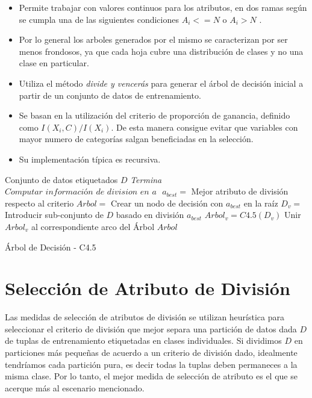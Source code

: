 \begin{itemize}
	\item Permite trabajar con valores continuos para los atributos, en dos ramas según se cumpla una de las siguientes condiciones  $ A_{i} <= N $ o $ A_{i} > N $ . 
	\item Por lo general los arboles generados por el mismo se caracterizan por ser menos frondosos, ya que cada hoja cubre una distribución de clases y no una clase en particular.
	\item Utiliza el método \emph{divide y vencerás} para generar el árbol de decisión inicial a partir de un conjunto de datos de entrenamiento.
	\item Se basan en la utilización del criterio de proporción de ganancia, definido como $ I(X_{i},C) / I(X_{i})  $. De esta manera consigue evitar que variables con mayor numero de categorías salgan beneficiadas en la selección. 
	\item Su implementación típica es recursiva.
\end{itemize}

\begin{algorithm}
	\begin{algorithmic}[1]
		\Require Conjunto de datos etiquetados $D$
				\State\textit{Termina}
			\EndIf
				\State $\textit{Computar información de division en a }$
			\EndFor
			\State $ a_{best} =$ Mejor atributo de división respecto al criterio 
			\State $ Arbol =$ Crear un nodo de decisión con $ a_{best} $ en la raíz 
			\State $ D_{v} =$ Introducir sub-conjunto de $D$ basado en división $ a_{best} $
				\State $ Arbol_{v} = C4.5(D_{v}) $
				\State Unir $ Arbol_{v} $ al correspondiente arco del Árbol
			\EndFor
			\State 
			\Return $ Arbol $
		\EndProcedure
	\end{algorithmic}
	\caption{\label{algoC45}Árbol de Decisión - C4.5}
\end{algorithm}


\section{Selección de Atributo de División}
Las medidas de selección de atributos de división se utilizan heurística para seleccionar el criterio de división que mejor separa una partición de datos dada $D$ de tuplas de entrenamiento etiquetadas en clases individuales. Si dividimos $D$ en particiones más pequeñas de acuerdo a un criterio de división dado, idealmente tendríamos cada partición pura, es decir todas la tuplas deben permaneces a la misma clase. Por lo tanto, el mejor medida de selección de atributo es el que se acerque más al escenario mencionado.

